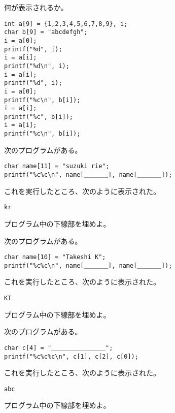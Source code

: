 \documentclass[12pt,a4j]{jarticle}
\newcounter{toi}
\def\toi{%
\bigskip\bigskip\noindent
\addtocounter{toi}{1}
\shadowbox{\bfseries\large 問\thetoi}
\nopagebreak[4]\bigskip\nopagebreak[4]
}
\begin{document}


\toi


何が表示されるか。
\begin{verbatim}
int a[9] = {1,2,3,4,5,6,7,8,9}, i;
char b[9] = "abcdefgh";
i = a[0];
printf("%d", i);
i = a[i];
printf("%d\n", i);
i = a[i];
printf("%d", i);
i = a[0];
printf("%c\n", b[i]);
i = a[i];
printf("%c", b[i]);
i = a[i];
printf("%c\n", b[i]);
\end{verbatim}











\toi

次のプログラムがある。
\begin{verbatim}
char name[11] = "suzuki rie";
printf("%c%c\n", name[＿＿＿＿], name[＿＿＿＿]);
\end{verbatim}
これを実行したところ、次のように表示された。
\begin{verbatim}
kr
\end{verbatim}
プログラム中の下線部を埋めよ。 




\toi

次のプログラムがある。
\begin{verbatim}
char name[10] = "Takeshi K";
printf("%c%c\n", name[＿＿＿＿], name[＿＿＿＿]);
\end{verbatim}
これを実行したところ、次のように表示された。
\begin{verbatim}
KT
\end{verbatim}
プログラム中の下線部を埋めよ。 






\toi


次のプログラムがある。
\begin{verbatim}
char c[4] = "＿＿＿＿＿＿＿＿＿";
printf("%c%c%c\n", c[1], c[2], c[0]);
\end{verbatim}
これを実行したところ、次のように表示された。
\begin{verbatim}
abc
\end{verbatim}
プログラム中の下線部を埋めよ。 


\end{document}
